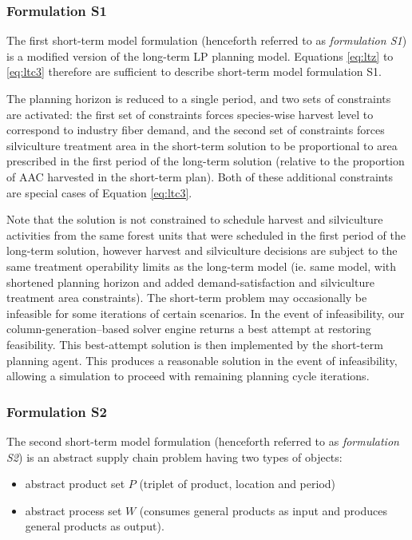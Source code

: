 \subsubsection{Formulation S1}
\label{sec:formulation-s1}

The first short-term model formulation (henceforth referred to as
\emph{formulation S1}) is a modified version of the long-term LP planning
model. Equations \ref{eq:ltz} to \ref{eq:ltc3} therefore are
sufficient to describe short-term model formulation S1.  

The planning horizon is reduced to a single period, and two sets of
constraints are activated: the first set of constraints forces
species-wise harvest level to correspond to industry fiber demand, and
the second set of constraints forces silviculture treatment area in
the short-term solution to be proportional to area prescribed in the first
period of the long-term solution (relative to the proportion of AAC harvested
in the short-term plan). Both of these additional constraints are special
cases of Equation \ref{eq:ltc3}.

Note that the solution is not constrained to schedule harvest and
silviculture activities from the same forest units that were scheduled
in the first period of the long-term solution, however harvest and
silviculture decisions are subject to the same treatment operability
limits as the long-term model (ie. same model, with shortened planning
horizon and added demand-satisfaction and silviculture treatment area
constraints).  The short-term problem may occasionally be
infeasible for some iterations of certain scenarios.  In the event of
infeasibility, our column-generation--based solver engine returns a best
attempt at restoring feasibility. This best-attempt solution is then
implemented by the short-term planning agent. This produces a reasonable
solution in the event of infeasibility, allowing a simulation to proceed
with remaining planning cycle iterations.


\subsubsection{Formulation S2}

The second short-term model formulation (henceforth referred to as
\emph{formulation S2}) is an abstract supply chain problem having two
types of objects:
\begin{itemize}
\item abstract product set $P$ (triplet of product, location and period) 
\item abstract process set $W$ (consumes general products as input and produces
general products as output).
\end{itemize}

